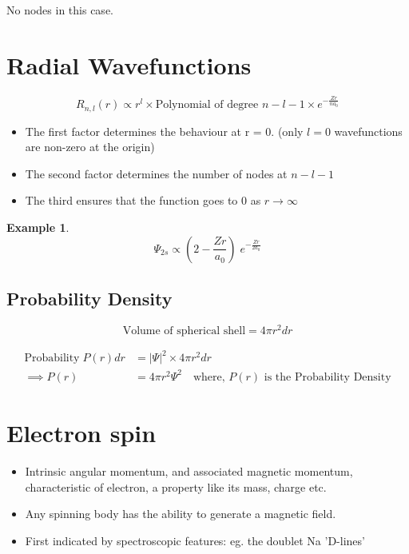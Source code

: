 \documentclass[12pt]{article}
\theoremstyle{definition}
\newtheorem*{example}{Example}
\begin{document}
No nodes in this case.

\section{Radial Wavefunctions}%
\label{sec:Radial Wavefunctions}

\begin{equation*}
	R_{n, l}(r) \propto r^l \times \textrm{Polynomial of degree $n-l-1$} \times e^{- \frac{Zr }{na_0} }
\end{equation*}

\begin{itemize}
	\item The first factor determines the behaviour at r = 0. (only $l = 0$ wavefunctions are non-zero at the origin)
	\item The second factor determines the number of nodes at $n - l - 1$
	\item The third ensures that the function goes to 0 as $r \to \infty$
\end{itemize}

\begin{example}
	\begin{equation*}
		\Psi_{2s} \propto \left( 2 - \frac{Zr}{a_0}  \right)\;e^{ -\frac{Zr}{2a_0} }
	\end{equation*}
\end{example}

\subsection{Probability Density}%
\label{sub:Probability Density}

\begin{equation*}
	\textrm{Volume of spherical shell} = 4 \pi r^2 dr
\end{equation*}

\begin{align*}
	\textrm{Probability}\;P(r)dr &= \left| \Psi \right|^2 \times 4\pi r^2 dr\\
	\implies P(r) &= 4 \pi r^2 \Psi^2\quad \textrm{where, $P(r)$ is the Probability Density} 
\end{align*}

\section{Electron spin}

\begin{itemize}
	\item Intrinsic angular momentum, and associated magnetic momentum, characteristic of electron, a property like its mass, charge etc.
	\item Any spinning body has the ability to generate a magnetic field. 
	\item First indicated by spectroscopic features: eg. the doublet Na 'D-lines'
\end{itemize}
\end{document}

